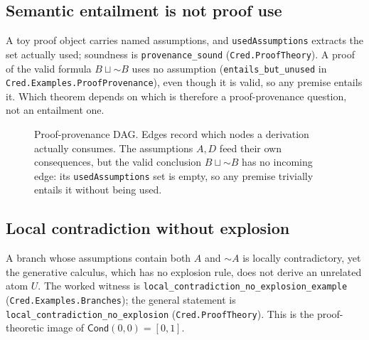 \documentclass[11pt,a4paper]{article}
\newcommand{\Cond}{\mathsf{Cond}}
\newcommand{\negc}{\mathord{\sim}}
\newcommand{\conjc}{\otimes}
\newcommand{\disjc}{\sqcup}
\newcommand{\Lean}[1]{\texttt{#1}}
\begin{document}
\subsection{Semantic entailment is not proof use}
A toy proof object carries named assumptions, and \Lean{usedAssumptions}
extracts the set actually used; soundness is \Lean{provenance\_sound}
(\texttt{Cred.ProofTheory}).  A proof of the valid formula
$B\disjc\negc B$ uses no assumption (\Lean{entails\_but\_unused} in
\texttt{Cred.Examples.ProofProvenance}), even though it is valid, so any
premise entails it.  Which theorem depends on which is therefore a
proof-provenance question, not an entailment one.

\begin{figure}[h]
\centering
{}
\caption{Proof-provenance DAG.  Edges record which nodes a derivation
actually consumes.  The assumptions $A,D$ feed their own consequences,
but the valid conclusion $B\disjc\negc B$ has no incoming edge: its
\Lean{usedAssumptions} set is empty, so any premise trivially entails it
without being used.}
\label{fig:provenance-dag}
\end{figure}

\subsection{Local contradiction without explosion}
A branch whose assumptions contain both $A$ and $\negc A$ is locally
contradictory, yet the generative calculus, which has no explosion rule,
does not derive an unrelated atom $U$.  The worked witness is
\Lean{local\_contradiction\_no\_explosion\_example}
(\texttt{Cred.Examples.Branches}); the general statement is
\Lean{local\_contradiction\_no\_explosion} (\texttt{Cred.ProofTheory}).
This is the proof-theoretic image of $\Cond(0,0)=[0,1]$.
\end{document}
